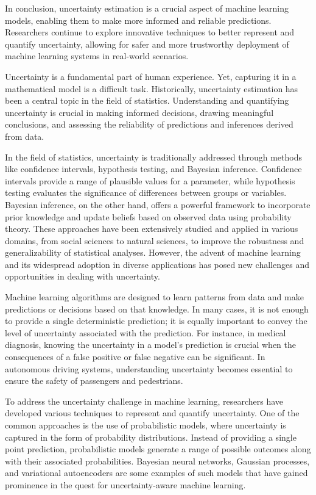 In conclusion, uncertainty estimation is a crucial aspect of machine learning models, enabling them to make more informed and reliable predictions. Researchers continue to explore innovative techniques to better represent and quantify uncertainty, allowing for safer and more trustworthy deployment of machine learning systems in real-world scenarios.





Uncertainty is a fundamental part of human experience. Yet, capturing it in a mathematical model is a difficult task. Historically, uncertainty estimation has been a central topic in the field of statistics. Understanding and quantifying uncertainty is crucial in making informed decisions, drawing meaningful conclusions, and assessing the reliability of predictions and inferences derived from data.


In the field of statistics, uncertainty is traditionally addressed through methods like confidence intervals, hypothesis testing, and Bayesian inference. Confidence intervals provide a range of plausible values for a parameter, while hypothesis testing evaluates the significance of differences between groups or variables. Bayesian inference, on the other hand, offers a powerful framework to incorporate prior knowledge and update beliefs based on observed data using probability theory. These approaches have been extensively studied and applied in various domains, from social sciences to natural sciences, to improve the robustness and generalizability of statistical analyses.
However, the advent of machine learning and its widespread adoption in diverse applications has posed new challenges and opportunities in dealing with uncertainty. 

Machine learning algorithms are designed to learn patterns from data and make predictions or decisions based on that knowledge. In many cases, it is not enough to provide a single deterministic prediction; it is equally important to convey the level of uncertainty associated with the prediction. For instance, in medical diagnosis, knowing the uncertainty in a model's prediction is crucial when the consequences of a false positive or false negative can be significant. In autonomous driving systems, understanding uncertainty becomes essential to ensure the safety of passengers and pedestrians.

To address the uncertainty challenge in machine learning, researchers have developed various techniques to represent and quantify uncertainty. One of the common approaches is the use of probabilistic models, where uncertainty is captured in the form of probability distributions. Instead of providing a single point prediction, probabilistic models generate a range of possible outcomes along with their associated probabilities. Bayesian neural networks, Gaussian processes, and variational autoencoders are some examples of such models that have gained prominence in the quest for uncertainty-aware machine learning.

